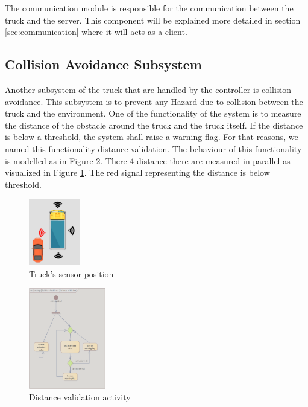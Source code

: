 The communication module is responsible for the communication between the truck and the server. This component will be explained more detailed in section \ref{sec:communication} where it will acts as a client.


\subsection{Collision Avoidance Subsystem}
\label{subsec:collition_avoidance}

Another subsystem of the truck that are handled by the controller is collision avoidance. This subsystem is to prevent any Hazard due to collision between the truck and the environment. One of the functionality of the system is to measure the distance of the obstacle around the truck and the truck itself. If the distance is below a threshold, the system shall raise a warning flag. For that reasons, we named this functionality distance validation. The behaviour of this functionality is modelled as in Figure \ref{img:distance_validation_activity}. There 4 distance there are measured in parallel as visualized in Figure \ref{img:distance_visual}. The red signal representing the distance is below threshold.

\begin{figure}[ht]
    \centering
    \includegraphics[width=0.2\textwidth]{images/distance_visual.png}
    \caption{Truck's sensor position}
    \label{img:distance_visual}
\end{figure}

\begin{figure}[ht]
    \centering
    \includegraphics[width=0.3\textwidth]{images/distance_validation_activity.png}
    \caption{Distance validation activity}
    \label{img:distance_validation_activity}
\end{figure}

